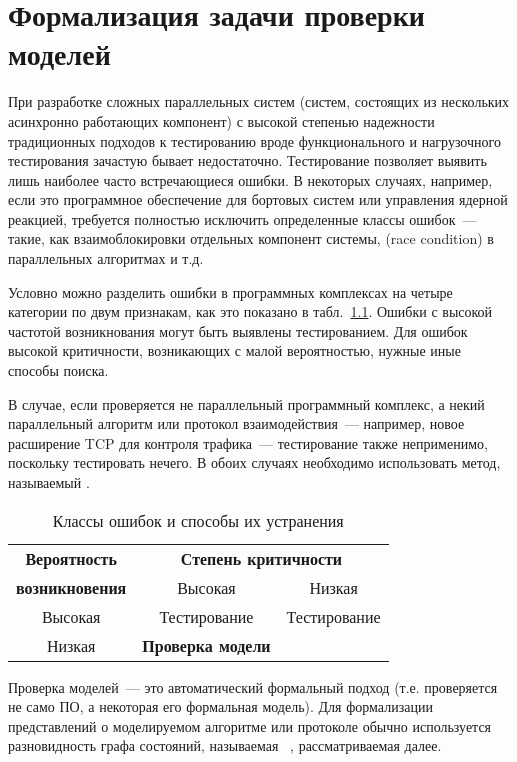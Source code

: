 \chapter{Формализация задачи проверки моделей}
\label{cha:model-checking}

При разработке сложных параллельных систем (систем, состоящих из нескольких асинхронно
работающих компонент) с высокой степенью надежности традиционных подходов к тестированию
вроде функционального и нагрузочного тестирования зачастую бывает
недостаточно. Тестирование позволяет выявить лишь наиболее часто встречающиеся ошибки. В
некоторых случаях, например, если это программное обеспечение для бортовых систем или
управления ядерной реакцией, требуется полностью исключить определенные классы ошибок~---
такие, как взаимоблокировки отдельных компонент системы,  (race condition) в
параллельных алгоритмах и т.д.

Условно можно разделить ошибки в программных комплексах на четыре категории по двум признакам, как
это показано в табл.~\ref{tab:error-classes}. Ошибки с высокой частотой возникнования
могут быть выявлены тестированием. Для ошибок высокой критичности, возникающих с малой
вероятностью, нужные иные способы поиска.

В случае, если проверяется не параллельный программный комплекс, а некий параллельный
алгоритм или протокол взаимодействия~--- например, новое расширение TCP для контроля
трафика~--- тестирование также неприменимо, поскольку тестировать нечего. В обоих случаях
необходимо использовать метод, называемый .

\begin{table}[hb]
  \centering
  \begin{tabular}{|c|c|c|} \hline
    \textbf{Вероятность} & \multicolumn{2}{|c|}{\bf Степень критичности} \\ \cline{2-3}
    \textbf{возникновения} & Высокая & Низкая \\ \hline
    Высокая & Тестирование & Тестирование \\  \hline
    Низкая  & \textbf{Проверка модели} &  \\  \hline
  \end{tabular}  \caption{Классы ошибок и способы их устранения}
  \label{tab:error-classes}
\end{table}

Проверка моделей~--- это автоматический формальный подход (т.е. проверяется не само ПО, а
некоторая его формальная модель). Для формализации представлений о моделируемом алгоритме
или протоколе обычно используется разновидность графа состояний, называемая ~\cite{Clarke}, рассматриваемая далее.

